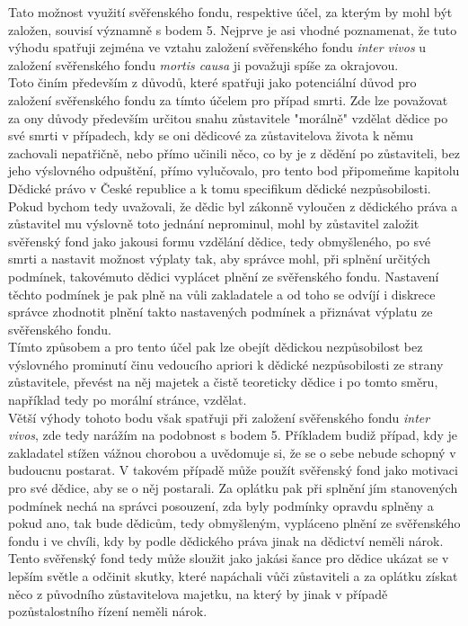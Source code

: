 \documentclass{article}
\begin{document}
Tato možnost využití svěřenského fondu, respektive účel, za kterým by mohl být založen, souvisí významně s bodem 5. Nejprve je asi vhodné poznamenat, že tuto výhodu spatřuji zejména ve vztahu založení svěřenského fondu \textit{inter vivos} u založení svěřenského fondu \textit{mortis causa} ji považuji spíše za okrajovou.\\

Toto činím především z důvodů, které spatřuji jako potenciální důvod pro založení svěřenského fondu za tímto účelem pro případ smrti. Zde lze považovat za ony důvody především určitou snahu zůstavitele "morálně" vzdělat dědice po své smrti v případech, kdy se oni dědicové za zůstavitelova života k němu zachovali nepatřičně, nebo přímo učinili něco, co by je z dědění po zůstaviteli, bez jeho výslovného odpuštění, přímo vylučovalo, pro tento bod připomeňme kapitolu Dědické právo v České republice a k tomu specifikum dědické nezpůsobilosti.\\

Pokud bychom tedy uvažovali, že dědic byl zákonně vyloučen z dědického práva a zůstavitel mu výslovně toto jednání neprominul, mohl by zůstavitel založit svěřenský fond jako jakousi formu vzdělání dědice, tedy obmyšleného, po své smrti a nastavit možnost výplaty tak, aby správce mohl, při splnění určitých podmínek, takovémuto dědici vyplácet plnění ze svěřenského fondu. Nastavení těchto podmínek je pak plně na vůli zakladatele a od toho se odvíjí i diskrece správce zhodnotit plnění takto nastavených podmínek a přiznávat výplatu ze svěřenského fondu.\\

Tímto způsobem a pro tento účel pak lze obejít dědickou nezpůsobilost bez výslovného prominutí činu vedoucího apriori k dědické nezpůsobilosti ze strany zůstavitele, převést na něj majetek a čistě teoreticky dědice i po tomto směru, například tedy po morální stránce, vzdělat.\\

Větší výhody tohoto bodu však spatřuji při založení svěřenského fondu \textit{inter vivos}, zde tedy narážím na podobnost s bodem 5. Příkladem budiž případ, kdy je zakladatel stížen vážnou chorobou a uvědomuje si, že se o sebe nebude schopný v budoucnu postarat. V takovém případě může použít svěřenský fond jako motivaci pro své dědice, aby se o něj postarali. Za oplátku pak při splnění jím stanovených podmínek nechá na správci posouzení, zda byly podmínky opravdu splněny a pokud ano, tak bude dědicům, tedy obmyšleným, vypláceno plnění ze svěřenského fondu i ve chvíli, kdy by podle dědického práva jinak na dědictví neměli nárok. Tento svěřenský fond tedy může sloužit jako jakási šance pro dědice ukázat se v lepším světle a odčinit skutky, které napáchali vůči zůstaviteli a za oplátku získat něco z původního zůstavitelova majetku, na který by jinak v případě pozůstalostního řízení neměli nárok.\\
\end{document}
